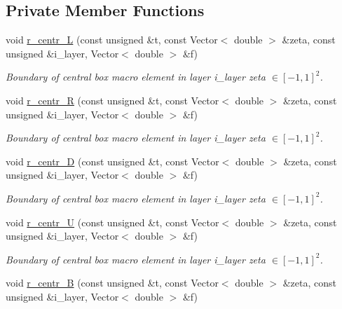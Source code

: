 \subsection*{Private Member Functions}
\begin{DoxyCompactItemize}
\item 
void \hyperlink{classoomph_1_1QuarterTubeDomain_ad150b2df8858d3936e7b6fb856de7ce1}{r\+\_\+centr\+\_\+L} (const unsigned \&t, const Vector$<$ double $>$ \&zeta, const unsigned \&i\+\_\+layer, Vector$<$ double $>$ \&f)
\begin{DoxyCompactList}\small\item\em Boundary of central box macro element in layer i\+\_\+layer zeta $ \in [-1,1]^2 $. \end{DoxyCompactList}\item 
void \hyperlink{classoomph_1_1QuarterTubeDomain_ae7312c0c8754d36a69e475cbf97e479e}{r\+\_\+centr\+\_\+R} (const unsigned \&t, const Vector$<$ double $>$ \&zeta, const unsigned \&i\+\_\+layer, Vector$<$ double $>$ \&f)
\begin{DoxyCompactList}\small\item\em Boundary of central box macro element in layer i\+\_\+layer zeta $ \in [-1,1]^2 $. \end{DoxyCompactList}\item 
void \hyperlink{classoomph_1_1QuarterTubeDomain_a4012aa5d6f8c535150823478164639c3}{r\+\_\+centr\+\_\+D} (const unsigned \&t, const Vector$<$ double $>$ \&zeta, const unsigned \&i\+\_\+layer, Vector$<$ double $>$ \&f)
\begin{DoxyCompactList}\small\item\em Boundary of central box macro element in layer i\+\_\+layer zeta $ \in [-1,1]^2 $. \end{DoxyCompactList}\item 
void \hyperlink{classoomph_1_1QuarterTubeDomain_afb2013af63e8207676102ee16d856dca}{r\+\_\+centr\+\_\+U} (const unsigned \&t, const Vector$<$ double $>$ \&zeta, const unsigned \&i\+\_\+layer, Vector$<$ double $>$ \&f)
\begin{DoxyCompactList}\small\item\em Boundary of central box macro element in layer i\+\_\+layer zeta $ \in [-1,1]^2 $. \end{DoxyCompactList}\item 
void \hyperlink{classoomph_1_1QuarterTubeDomain_a32896043befe8df1ff01d9de166c1201}{r\+\_\+centr\+\_\+B} (const unsigned \&t, const Vector$<$ double $>$ \&zeta, const unsigned \&i\+\_\+layer, Vector$<$ double $>$ \&f)

\end{DoxyCompactItemize}

